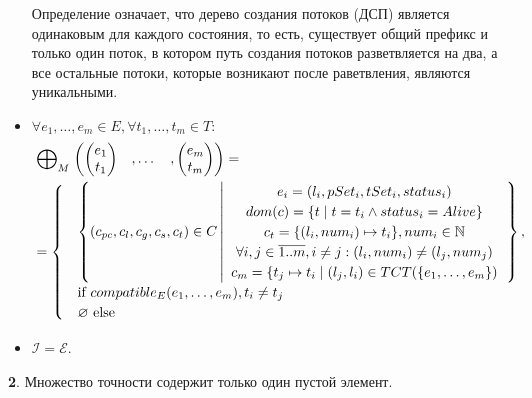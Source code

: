 \begin{itemize}
Определение означает, что дерево создания потоков (ДСП) является одинаковым для каждого состояния, то есть, существует общий префикс и только один поток, в котором путь создания потоков разветвляется на два, а все остальные потоки, которые возникают после раветвления, являются уникальными.

\item $\forall e_1, \dots, e_m \in E, \forall t_1, \dots, t_m \in T:$
\begin{equation}
\label{epp_thread_M}
\begin{aligned}
& \mathrel{\bigoplus}_{M}
\begin{pmatrix}
\begin{pmatrix}
e_1 \\
t_1 
\end{pmatrix}& ,
\dots& ,
\begin{pmatrix}
e_m \\
t_m 
\end{pmatrix}
\end{pmatrix} = \\
& = \begin{cases}
& \left\lbrace (c_{pc},c_l,c_g,c_s, c_t) \in C 
\left| 
\begin{array}{c}
e_i = (l_i, pSet_i, tSet_i, status_i) \\
dom(c) = \{t \mid t = t_i \land status_i = Alive\}\\
c_t = \{(l_i, num_i) \mapsto t_i\}, num_i \in \mathbb{N} \\
\forall i, j \in \overline{1..m}, i \neq j: (l_i, num_i) \neq (l_j, num_j)\\
c_m = \{ t_j \mapsto t_i \mid (l_j, l_i) \in TCT(\{e_1, \dots, e_m\}) \\
\end{array}
\right.
\right\rbrace, \\
& \mbox{if } compatible_{E}(e_1, \dots, e_m), t_i \neq t_j \\
& \varnothing \mbox{ else}
\end{cases}
\end{aligned}
\end{equation}

\item $\mathcal{I}=\mathcal{E}$. 
\end{itemize}

{\textbf 2.} Множество точности содержит только один пустой элемент.

